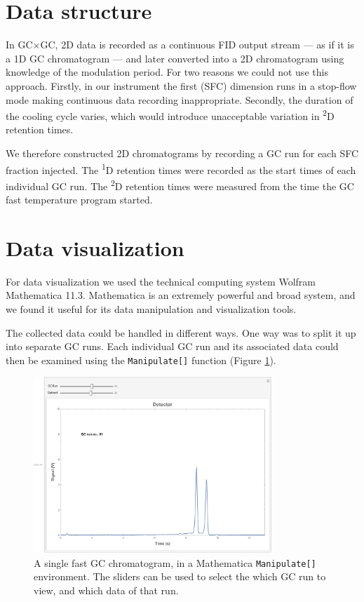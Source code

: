 \section{Data structure}

In GC×GC, 2D data is recorded as a continuous FID output stream --- as if it is
a 1D GC chromatogram --- and later converted into a 2D chromatogram using
knowledge of the modulation period. For two reasons we could not use this
approach. Firstly, in our instrument the first (SFC) dimension runs in a
stop-flow mode making continuous data recording inappropriate. Secondly, the
duration of the cooling cycle varies, which would introduce unacceptable
variation in \textsuperscript{2}D retention times.

We therefore constructed 2D chromatograms by recording a GC run for each SFC
fraction injected. The \textsuperscript{1}D
retention times were recorded as the start times of each individual GC run.
The \textsuperscript{2}D retention times were measured from
the time the GC fast temperature program started. 

\section{Data visualization}
For data visualization we used the technical computing system Wolfram
Mathematica 11.3\texttrademark{}. Mathematica is an extremely powerful and broad
system, and we found it useful for its data manipulation and visualization
tools.

The collected data could be handled in different ways. One way was to split it
up into separate GC runs. Each individual GC run and its associated data could
then be examined using the \texttt{Manipulate[]} function (Figure
\ref{fig:SingleGC}).

\begin{figure}
	\centering
	\includegraphics[width=0.8\textwidth]{Figures/Manipulate.pdf}
	\decoRule
	
	\caption[A single fast GC chromatogram ]{A single fast GC chromatogram, in a
	Mathematica \texttt{Manipulate[]} environment. The sliders can be used to select
	the which GC run to view, and which data of that run. }
	
	\label{fig:SingleGC}
\end{figure}

